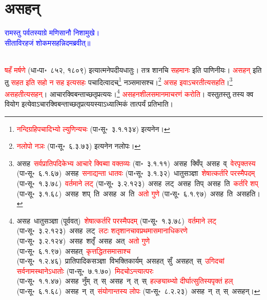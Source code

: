 \section[असहन्]{असहन्}
\centering\textcolor{blue}{रामस्तु पर्वतस्याग्रे मणिसानौ निशामुखे।\nopagebreak\\
सीताविरहजं शोकमसहन्निदमब्रवीत्॥}\nopagebreak\\
\\
\begin{sloppypar}\justifying\noindent\hspace{10mm} \textcolor{red}{षहँ मर्षणे} (धा॰पा॰~८५२, १८०९) इत्यात्मनेपदीय\-धातुः। तत्र शानचि \textcolor{red}{सहमानः} इति पाणिनीयः। \textcolor{red}{असहन्} इति तु \textcolor{red}{सहत इति सहो न सह इत्यसहः} पचादित्वादच्\footnote{\textcolor{red}{नन्दि\-ग्रहि\-पचादिभ्यो ल्युणिन्यचः} (पा॰सू॰~३.१.१३४) इत्यनेन।} नञ्समासश्च।\footnote{\textcolor{red}{नलोपो नञः} (पा॰सू॰~६.३.७३) इत्यनेन नलोपः।} \textcolor{red}{असह इवाऽचरतीत्यसहति}।\footnote{असह~\arrow \textcolor{red}{सर्वप्राति\-पदिकेभ्य आचारे क्विब्वा वक्तव्यः} (वा॰~३.१.११)~\arrow असह~क्विँप्~\arrow असह~व्~\arrow \textcolor{red}{वेरपृक्तस्य} (पा॰सू॰~६.१.६७)~\arrow असह~\arrow \textcolor{red}{सनाद्यन्ता धातवः} (पा॰सू॰~३.१.३२)~\arrow धातुसञ्ज्ञा~\arrow \textcolor{red}{शेषात्कर्तरि परस्मैपदम्} (पा॰सू॰~१.३.७८)~\arrow \textcolor{red}{वर्तमाने लट्} (पा॰सू॰~३.२.१२३)~\arrow असह~लट्~\arrow असह~तिप्~\arrow असह~ति~\arrow \textcolor{red}{कर्तरि शप्‌} (पा॰सू॰~३.१.६८)~\arrow असह~शप्~ति~\arrow असह~अ~ति~\arrow \textcolor{red}{अतो गुणे} (पा॰सू॰~६.१.९७)~\arrow असह~ति~\arrow असहति।} \textcolor{red}{असहतीत्यसहन्}। आचार\-क्विबन्ताच्छतृ\-प्रत्ययः।\footnote{असह~\arrow धातुसञ्ज्ञा (पूर्ववत्)~\arrow \textcolor{red}{शेषात्कर्तरि परस्मैपदम्} (पा॰सू॰~१.३.७८)~\arrow \textcolor{red}{वर्तमाने लट्} (पा॰सू॰~३.२.१२३)~\arrow असह~लट्~\arrow \textcolor{red}{लटः शतृशानचावप्रथमा\-समानाधिकरणे} (पा॰सू॰~३.२.१२४)~\arrow असह~शतृँ~\arrow असह~अत्~\arrow \textcolor{red}{अतो गुणे} (पा॰सू॰~६.१.९७)~\arrow असहत्~\arrow \textcolor{red}{कृत्तद्धित\-समासाश्च} (पा॰सू॰~१.२.४६)~\arrow प्रातिपादिक\-सञ्ज्ञा~\arrow विभक्ति\-कार्यम्~\arrow असहत्~सुँ~\arrow असहत्~स्~\arrow \textcolor{red}{उगिदचां सर्वनामस्थानेऽधातोः} (पा॰सू॰~७.१.७०)~\arrow \textcolor{red}{मिदचोऽन्त्यात्परः} (पा॰सू॰~१.१.४७)~\arrow असह~नुँम्~त्~स्~\arrow असह~न्~त्~स्~\arrow \textcolor{red}{हल्ङ्याब्भ्यो दीर्घात्सुतिस्यपृक्तं हल्} (पा॰सू॰~६.१.६८)~\arrow असह~न्~त्~\arrow \textcolor{red}{संयोगान्तस्य लोपः} (पा॰सू॰~८.२.२३)~\arrow असह~न्~त्~स्~\arrow असहन्।
} \textcolor{red}{असहन\-शील\-समानमाचरणं करोति}। वस्तुतस्तु तस्य क्व वियोग इत्येवाऽचार\-क्विबन्ताच्छतृ\-प्रत्ययस्याऽध्यात्मिकं तात्पर्यं प्रतिभाति।\end{sloppypar}
